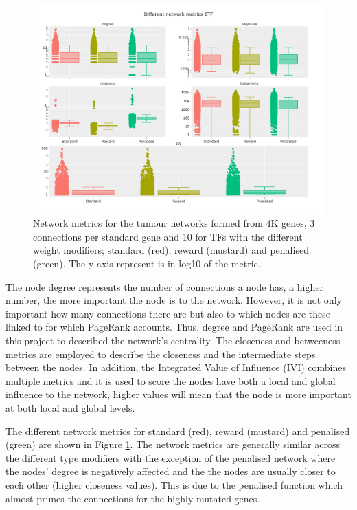 \begin{figure}[!t]  
\centering
\includegraphics[width=1.0\textwidth,keepaspectratio]{Sections/Network_I/Resources/Tum_network/NetworkMetricsComp_6TF.png}
    \caption{Network metrics for the tumour networks formed from 4K genes, 3 connections per standard gene and 10 for TFs with the different weight modifiers; standard (red), reward (mustard) and penalised (green). The y-axis represent is in log10 of the metric.}
    \label{fig:N_I:net_metrics_tum}
\end{figure}

The node degree represents the number of connections a node has, a higher number, the more important the node is to the network. However, it is not only important how many connections there are but also to which nodes are these linked to for which PageRank \citep{Brin1998-mc} accounts. Thus, degree and PageRank are used in this project to described the network's centrality. The closeness and betweeness metrics are employed to describe the closeness and the intermediate steps between the nodes. In addition, the Integrated Value of Influence (IVI) \cite{Salavaty2020-wo} combines multiple metrics and it is used to score the nodes have both a local and global influence to the network, higher values will mean that the node is more important at both local and global levels.

The different network metrics for standard (red), reward (mustard) and penalised (green) are shown in Figure \ref{fig:N_I:net_metrics_tum}. The network metrics are generally similar across the different type modifiers with the exception of the penalised network where the nodes' degree is negatively affected and the the nodes are usually closer to each other (higher closeness values). This is due to the penalised function which almost prunes the connections for the highly mutated genes.

